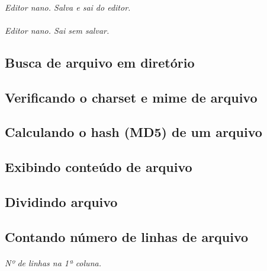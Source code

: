\documentclass[a4paper,9pt]{extarticle}
\begin{document}
\begin{multicols}{2}
	\paragraph{} \emph{Editor nano. Salva e sai do editor.}
	
	\paragraph{} \emph{Editor nano. Sai sem salvar.}
	
\subsection{Busca de arquivo em diretório}
\subsection{Verificando o charset e mime de arquivo}
	
		
\subsection{Calculando o hash (MD5) de um arquivo}

	\paragraph{}
	
\subsection{Exibindo conteúdo de arquivo}
\subsection{Dividindo arquivo}


\subsection{Contando número de linhas de arquivo}
	
	\paragraph{} \emph{Nº de linhas na 1ª coluna.}
	

\end{multicols}
\end{document}
